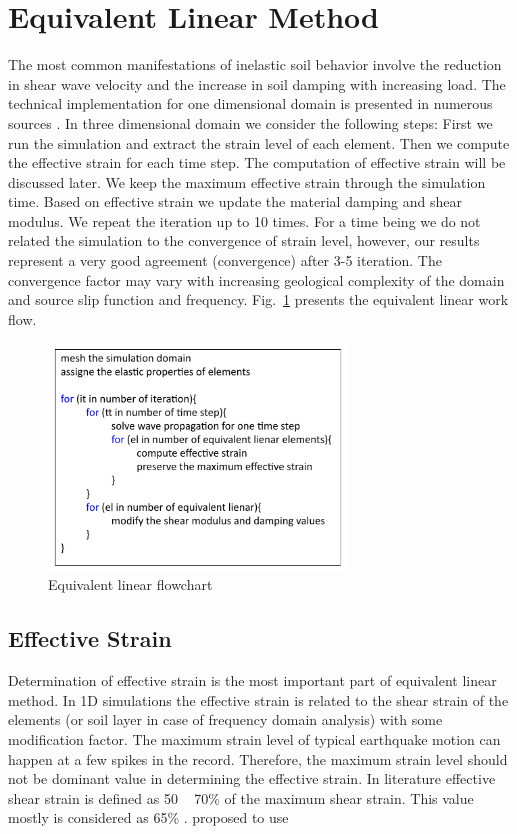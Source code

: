 
\section{Equivalent Linear Method}

The most common manifestations of inelastic soil behavior involve the reduction in shear wave velocity and the increase in soil damping with increasing load. The technical implementation for one dimensional domain is presented in numerous sources \citep[e.g.,][]{Kramer1996geotechnical}. In three dimensional domain we consider the following steps: First we run the simulation and extract the strain level of each element. Then we compute the effective strain for each time step. The computation of effective strain will be discussed later. We keep the maximum effective strain through the simulation time. Based on effective strain we update the material damping and shear modulus. We repeat the iteration up to 10 times. For a time being we do not related the simulation to the convergence of strain level, however, our results represent a very good agreement (convergence) after 3-5 iteration. The convergence factor may vary with increasing geological complexity of the domain and source slip function and frequency. Fig.~\ref{fig:equivalent_linear_flowchart} presents the equivalent linear work flow. 

\begin{figure}[H]
    \centering
    \includegraphics[width=300px]{figures/pdf/equivalent_linear_flowchart.pdf}
    \caption{Equivalent linear flowchart}
    \label{fig:equivalent_linear_flowchart}
\end{figure}


\subsection{Effective Strain}

Determination of effective strain is the most important part of equivalent linear method. In 1D simulations the effective strain is related to the shear strain of the elements (or soil layer in case of frequency domain analysis) with some modification factor. The maximum strain level of typical earthquake motion can happen at a few spikes in the record. Therefore, the maximum strain level should not be dominant value in determining the effective strain. In literature effective shear strain is defined as 50 ~ 70\% of the maximum shear strain. This value mostly is considered as 65\% \citep{Kramer1996geotechnical}.  \citet{Idriss1992} proposed to use 

